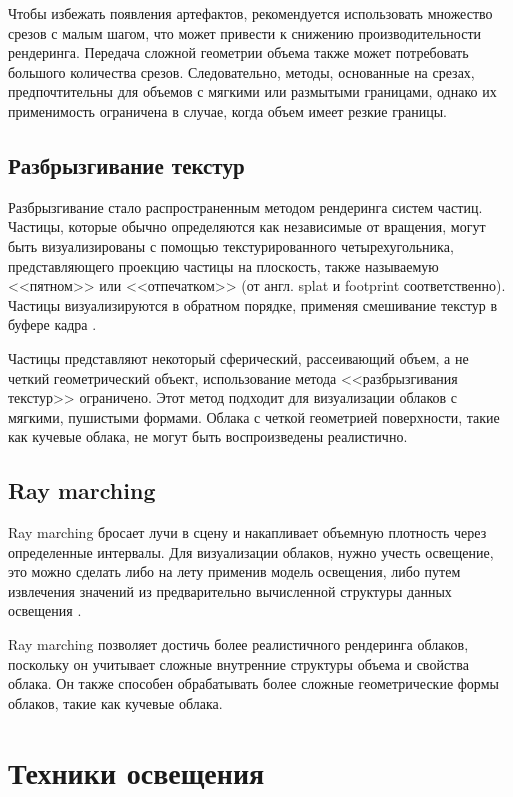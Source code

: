 Чтобы избежать появления артефактов, рекомендуется использовать множество срезов с малым шагом, что может привести к снижению производительности рендеринга. Передача сложной геометрии объема также может потребовать большого количества срезов. Следовательно, методы, основанные на срезах, предпочтительны для объемов с мягкими или размытыми границами, однако их применимость ограничена в случае, когда объем имеет резкие границы.

\subsection{Разбрызгивание текстур}
\label{splatting}
Разбрызгивание стало распространенным методом рендеринга систем частиц. Частицы, которые обычно определяются как независимые от вращения, могут быть визуализированы с помощью текстурированного четырехугольника, представляющего проекцию частицы на плоскость, также называемую <<пятном>> или <<отпечатком>> (от англ. splat и footprint соответственно). Частицы визуализируются в обратном порядке, применяя смешивание текстур в буфере кадра \cite{voxel, clouds}. 

Частицы представляют некоторый сферический, рассеивающий объем, а не четкий геометрический объект, использование метода <<разбрызгивания текстур>> ограничено.  Этот метод подходит для визуализации облаков с мягкими, пушистыми формами. Облака с четкой геометрией поверхности, такие как кучевые облака, не могут быть воспроизведены реалистично.


\subsection{Ray marching}
\label{ray}
Ray marching бросает лучи в сцену и накапливает объемную плотность через определенные интервалы. Для визуализации облаков, нужно учесть освещение, это можно сделать либо на лету применив модель освещения, либо путем извлечения значений из предварительно вычисленной структуры данных освещения \cite{hzd, frostbite, clouds}.

Ray marching позволяет достичь более реалистичного рендеринга облаков, поскольку он учитывает сложные внутренние структуры объема и свойства облака. Он также способен обрабатывать более сложные геометрические формы облаков, такие как кучевые облака.


\section{Техники освещения}

